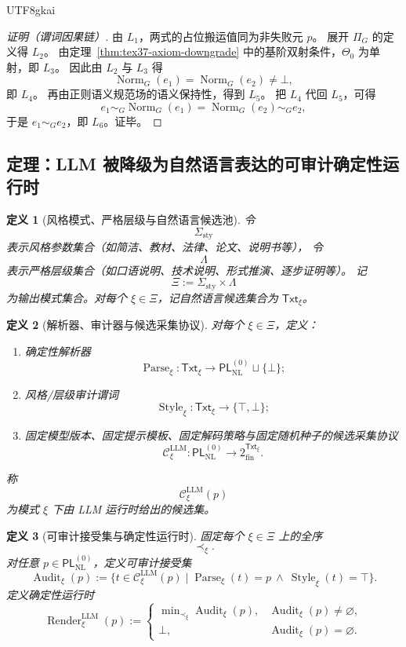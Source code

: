 \documentclass[12pt]{article}
\newtheorem{definition}{定义}[section]
\newcommand{\Norm}{\operatorname{Norm}}
\newcommand{\Parse}{\operatorname{Parse}}
\newcommand{\Audit}{\operatorname{Audit}}
\newcommand{\Render}{\operatorname{Render}}
\newcommand{\Style}{\operatorname{Style}}
\begin{document}
\begin{CJK*}{UTF8}{gkai}
\begin{proof}[证明（谓词因果链）]
由 $L_1$，两式的占位搬运值同为非失败元 $p$。
展开 $\Pi_G$ 的定义得 $L_2$。
由定理~\ref{thm:tex37-axiom-downgrade} 中的基阶双射条件，$\Theta_0$ 为单射，即 $L_3$。
因此由 $L_2$ 与 $L_3$ 得
\[
  \Norm_G(e_1)=\Norm_G(e_2)\neq\bot,
\]
即 $L_4$。
再由正则语义规范场的语义保持性，得到 $L_5$。
把 $L_4$ 代回 $L_5$，可得
\[
  e_1\sim_G \Norm_G(e_1)=\Norm_G(e_2)\sim_G e_2,
\]
于是 $e_1\sim_G e_2$，即 $L_6$。证毕。
\end{proof}

\subsection{定理：LLM 被降级为自然语言表达的可审计确定性运行时}
\label{subsec:tex37-runtime}

\begin{definition}[风格模式、严格层级与自然语言候选池]
令
\[
  \Sigma_{\mathrm{sty}}
\]
表示风格参数集合（如简洁、教材、法律、论文、说明书等），
令
\[
  \Lambda
\]
表示严格层级集合（如口语说明、技术说明、形式推演、逐步证明等）。
记
\[
  \Xi:=\Sigma_{\mathrm{sty}}\times\Lambda
\]
为输出模式集合。对每个 $\xi\in\Xi$，记自然语言候选集合为 $\mathsf{Txt}_\xi$。
\end{definition}

\begin{definition}[解析器、审计器与候选采集协议]
对每个 $\xi\in\Xi$，定义：
\begin{enumerate}
  \item 确定性解析器
  \[
    \Parse_\xi:\mathsf{Txt}_\xi\to \mathsf{PL}_{\mathrm{NL}}^{(0)}\sqcup\{\bot\};
  \]
  \item 风格/层级审计谓词
  \[
    \Style_\xi:\mathsf{Txt}_\xi\to\{\top,\bot\};
  \]
  \item 固定模型版本、固定提示模板、固定解码策略与固定随机种子的候选采集协议
  \[
    \mathcal{C}^{\mathrm{LLM}}_\xi:
    \mathsf{PL}_{\mathrm{NL}}^{(0)}\to
    2^{\mathsf{Txt}_\xi}_{\mathrm{fin}}.
  \]
\end{enumerate}
称
\[
  \mathcal{C}^{\mathrm{LLM}}_\xi(p)
\]
为模式 $\xi$ 下由 LLM 运行时给出的候选集。
\end{definition}

\begin{definition}[可审计接受集与确定性运行时]
固定每个 $\xi\in\Xi$ 上的全序
\[
  \prec_\xi.
\]
对任意 $p\in \mathsf{PL}_{\mathrm{NL}}^{(0)}$，定义可审计接受集
\[
  \Audit_\xi(p)
  :=
  \bigl\{
    t\in \mathcal{C}^{\mathrm{LLM}}_\xi(p)
    \mid
    \Parse_\xi(t)=p\ \wedge\ \Style_\xi(t)=\top
  \bigr\}.
\]
定义确定性运行时
\[
  \Render^{\mathrm{LLM}}_\xi(p)
  :=
  \begin{cases}
    \min\nolimits_{\prec_\xi}\Audit_\xi(p), & \Audit_\xi(p)\neq\varnothing,\\
    \bot, & \Audit_\xi(p)=\varnothing.
  \end{cases}
\]
\end{definition}


\end{CJK*}
\end{document}
